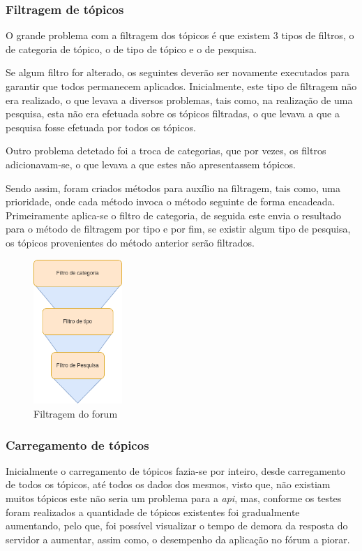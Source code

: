 \subsubsection{Filtragem de tópicos}
O grande problema com a filtragem dos tópicos é que existem 3 tipos de filtros, o de categoria de tópico, o de tipo de tópico e o de pesquisa. 

Se algum filtro for alterado, os seguintes deverão ser novamente executados para garantir que todos permanecem aplicados. Inicialmente, este tipo de filtragem não era realizado, o que levava a diversos problemas, tais como, na realização de uma pesquisa, esta não era efetuada sobre os tópicos filtradas, o que levava a que a pesquisa fosse efetuada por todos os tópicos.

Outro problema detetado foi a troca de categorias, que por vezes, os filtros adicionavam-se, o que levava a que estes não apresentassem tópicos.

Sendo assim, foram criados métodos para auxílio na filtragem, tais como, uma prioridade, onde cada método invoca o método seguinte de forma encadeada. Primeiramente aplica-se o filtro de categoria, de seguida este envia o resultado para o método de filtragem por tipo e por fim, se existir algum tipo de pesquisa, os tópicos provenientes do método anterior serão filtrados.

\begin{figure}[htb]
 \centering
 \includegraphics[width=0.3\textwidth]{images/implementacao/frontend/forum/filtros/filtros.png}
 \caption{Filtragem do forum}
 \label{fig:73}
\end{figure}

\subsubsection{Carregamento de tópicos}
Inicialmente o carregamento de tópicos fazia-se por inteiro, desde carregamento de todos os tópicos, até todos os dados dos mesmos, visto que, não existiam muitos tópicos este não seria um problema para a \textit{\acrshort{api}}, mas, conforme os testes foram realizados a quantidade de tópicos existentes foi gradualmente aumentando, pelo que, foi possível visualizar o tempo de demora da resposta do servidor a aumentar, assim como, o desempenho da aplicação no fórum a piorar.

